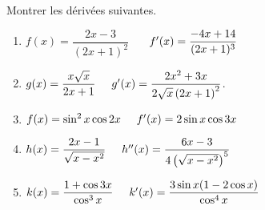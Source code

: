 
\everymath{\displaystyle}


  \summary{}

\begin{exercice}
 Montrer les dérivées suivantes. 
 \begin{enumerate}
\item
  $  f(x)=\dfrac{2x-3}{(2x+1)^2} $
   $\hspace*{0.5cm} f^{\prime}(x)=\dfrac{-4x+14}{(2x+1)^3} $
\item$ g(x)=\dfrac{x\sqrt{x}}{2x+1} \hspace*{0.5cm} g^{\prime}(x)=\dfrac{2x^2+3x}{2\sqrt{x}\left(2x+1\right)^2} $.
\item $ f(x)=\sin^ 2 x \cos 2x \hspace*{0.5cm} f^{\prime}(x)= 2 \sin x \cos 3x $
\item $ h(x)=\dfrac{2x-1}{\sqrt{x-x^2}} \hspace*{0.5cm} h^{\prime\prime}(x)=\dfrac{6x-3}{4\left(\sqrt{x-x^2}\right)^5} $
\item $ k(x)=\dfrac{1+\cos 3x}{\cos^3 x} \hspace*{0.5cm}  k^{\prime}(x)=\dfrac{3\sin x(1-2\cos x)}{\cos^4 x} $
\end{enumerate}
\end{exercice}

